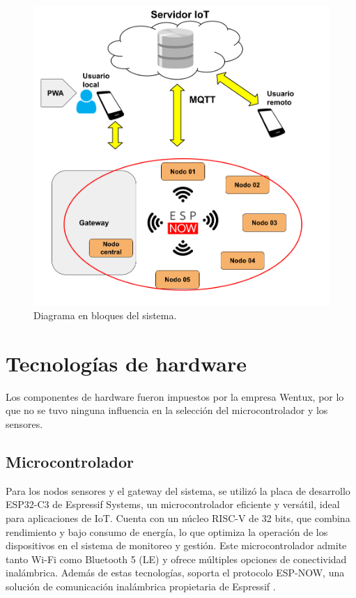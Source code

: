 \begin{figure}[H]
\centering 
\includegraphics[width=.8\textwidth]{./Figures/Diagrama_bloques.png}
\caption{Diagrama en bloques del sistema.}
\label{fig:diagBloques}
\end{figure}



\section{Tecnologías de hardware}

Los componentes de hardware fueron impuestos por la empresa Wentux, por lo que no se tuvo ninguna influencia en la selección del microcontrolador y los sensores.

\subsection{Microcontrolador}

Para los nodos sensores y el gateway del sistema, se utilizó la placa de desarrollo ESP32-C3 de Espressif Systems, un microcontrolador eficiente y versátil, ideal para aplicaciones de IoT. Cuenta con un núcleo RISC-V de 32 bits, que combina rendimiento y bajo consumo de energía, lo que optimiza la operación de los dispositivos en el sistema de monitoreo y gestión.
Este microcontrolador admite tanto Wi-Fi como Bluetooth 5 (LE) y ofrece múltiples opciones de conectividad inalámbrica. Además de estas tecnologías, soporta el protocolo ESP-NOW, una solución de comunicación inalámbrica propietaria de Espressif \citep{esp32c3}.

